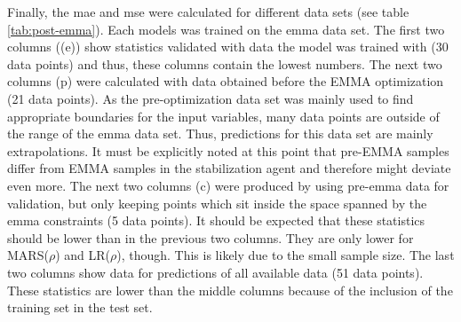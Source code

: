 \iffalse
\begin{align}
    \label{eq:r2-krr-g}
    R^2(\gamma_{krr}) &= -0.50 \pm 0.25\\
    \label{eq:r2-krr-p}
    R^2(\rho_{krr})   &= -0.45 \pm 0.52\\
    \label{eq:r2-svm-g}
    R^2(\gamma_{svm}) &= -0.37 \pm 0.39\\
    \label{eq:r2-svm-p}
    R^2(\rho_{svm})   &= -0.95 \pm 0.44
\end{align}
\fi

%
Finally, the \gls{mae} and \gls{mse} were calculated for different data sets 
(see table \ref{tab:post-emma}). 
Each models was trained on the \gls{emma} data set.
The first two columns ((e)) show statistics validated with data the model was trained with (30 data points) and thus, 
these columns contain the lowest numbers. 
The next two columns (p) were calculated with data obtained before the EMMA optimization (21 data points). 
As the pre-optimization data set was mainly used to find appropriate boundaries for the input variables, 
many data points are outside of the range of the \gls{emma} data set. 
Thus, predictions for this data set are mainly extrapolations. 
It must be explicitly noted at this point that pre-EMMA samples differ from EMMA samples 
in the stabilization agent and therefore might deviate even more. 
The next two columns (c) were produced by using pre-\gls{emma} data for validation, 
but only keeping points which sit inside the space spanned by the \gls{emma} constraints (5 data points). 
It should be expected that these statistics should be lower than in the previous two columns. 
They are only lower for MARS($\rho$) and LR($\rho$), though. 
This is likely due to the small sample size.
The last two columns show data for predictions of all available data (51 data points). 
These statistics are lower than the middle columns because of the inclusion of the training set in the test set. 


